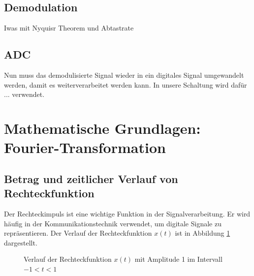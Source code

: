 \subsection{Demodulation}
Iwas mit Nyquisr Theorem und Abtastrate 

\subsection{ADC}
Nun muss das demodulisierte Signal wieder in ein digitales Signal umgewandelt werden, damit es weiterverarbeitet werden kann.
In unsere Schaltung wird dafür ... verwendet. 


\section{Mathematische Grundlagen: Fourier-Transformation}
\subsection{Betrag und zeitlicher Verlauf von Rechteckfunktion}
Der Rechteckimpuls ist eine wichtige Funktion in der Signalverarbeitung.
Er wird häufig in der Kommunikationstechnik verwendet, um digitale Signale zu repräsentieren.
Der Verlauf der Rechteckfunktion $x(t)$ ist in Abbildung \ref{fig:rechteck} dargestellt.
\begin{figure}[H]
    \centering
    \caption{Verlauf der Rechteckfunktion $x(t)$ mit Amplitude 1 im Intervall $-1 < t < 1$}
    \label{fig:rechteck}
\end{figure}

